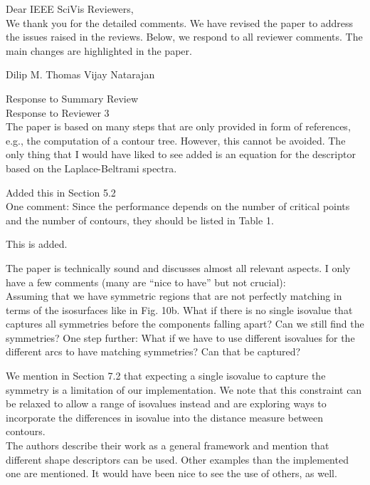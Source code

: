 \documentclass[10pt]{article}
\title{}
\date{}
\begin{document}
\noindent Dear IEEE SciVis Reviewers,\\

We thank you for the detailed comments. We have revised the paper to address the issues raised in the reviews. Below, we respond to all reviewer comments. The main changes are highlighted in the paper.

Dilip M. Thomas
Vijay Natarajan

{\noindent \LARGE Response to Summary Review}\\


{\noindent \LARGE Response to Reviewer 3}\\

The paper is based on many steps that are only provided in form of
   references, e.g., the computation of a contour tree. However, this cannot
   be avoided. The only thing that I would have liked to see added is an
   equation for the descriptor based on the Laplace-Beltrami spectra.

   {\color{blue}Added this in Section 5.2}\\

   One comment:
   Since the performance depends on the number of critical points and the
   number of contours, they should be listed in Table 1.

   {\color{blue}This is added.}

   The paper is technically sound and discusses almost all relevant aspects.
   I only have a few comments (many are ``nice to have'' but not crucial):\\

   Assuming that we have symmetric regions that are not perfectly matching
   in terms of the isosurfaces like in Fig. 10b. What if there is no single
   isovalue that captures all symmetries before the components falling
   apart? Can we still find the symmetries? One step further: What if we
   have to use different isovalues for the different arcs to have matching
   symmetries? Can that be captured?

   {\color{blue}We mention in Section 7.2 that expecting a single isovalue
	to capture the symmetry is a limitation of our
	   implementation. We note that this constraint can be relaxed to allow
	   a range of isovalues instead and are exploring ways to incorporate
   the differences in isovalue into the distance measure between contours.}\\
   
   The authors describe their work as a general framework and mention that
   different shape descriptors can be used. Other examples than the
   implemented one are mentioned. It would have been nice to see the use of
   others, as well. 
\end{document}
